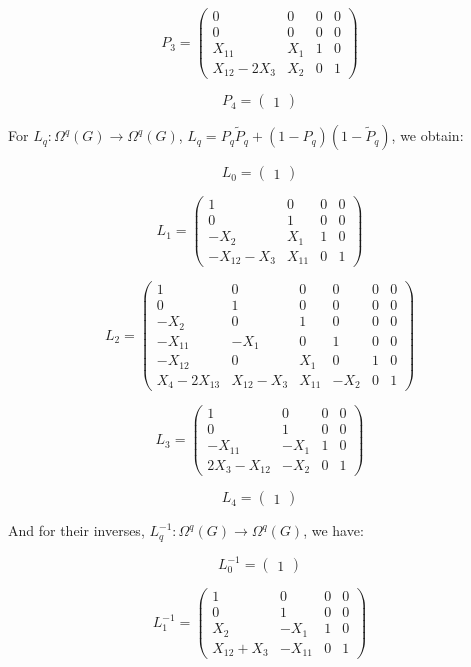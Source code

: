 \documentclass[reqno,12pt]{amsart}
\theoremstyle{plain}
\theoremstyle{definition}
\begin{document}
$$
P_3=\left(\begin{array}{c|c|cc}
0&0&0&0\\
0&0&0&0\\\hline
X_{11}&X_1&1&0\\\hline
X_{12}-2X_3&X_2&0&1
\end{array}\right)
$$

$$
P_4=\left(\begin{array}{c}
1
\end{array}\right)
$$

For $L_q\colon\Omega^q(G)\to\Omega^q(G)$, $L_q=P_q\tilde P_q+(1-P_q)(1-\tilde P_q)$, we obtain:

$$
L_0=\left(\begin{array}{c}
1
\end{array}\right)
$$

$$
L_1=\left(\begin{array}{cc|c|c}
1&0&0&0\\
0&1&0&0\\\hline
-X_2&X_1&1&0\\\hline
-X_{12}-X_3&X_{11}&0&1
\end{array}\right)
$$

$$
L_2=\left(\begin{array}{c|cc|cc|c}
1&0&0&0&0&0\\\hline
0&1&0&0&0&0\\
-X_2&0&1&0&0&0\\\hline
-X_{11}&-X_1&0&1&0&0\\
-X_{12}&0&X_1&0&1&0\\\hline
X_4-2X_{13}&X_{12}-X_3&X_{11}&-X_2&0&1
\end{array}\right)
$$

$$
L_3=\left(\begin{array}{c|c|cc}
1&0&0&0\\
0&1&0&0\\\hline
-X_{11}&-X_1&1&0\\\hline
2X_3-X_{12}&-X_2&0&1
\end{array}\right)
$$

$$
L_4=\left(\begin{array}{c}
1
\end{array}\right)
$$


And for their inverses, $L_q^{-1}\colon\Omega^q(G)\to\Omega^q(G)$, we have:


$$
L_0^{-1}=\left(\begin{array}{c}
1
\end{array}\right)
$$

$$
L_1^{-1}=\left(\begin{array}{cc|c|c}
1&0&0&0\\
0&1&0&0\\\hline
X_2&-X_1&1&0\\\hline
X_{12}+X_3&-X_{11}&0&1
\end{array}\right)
$$
\end{document}
